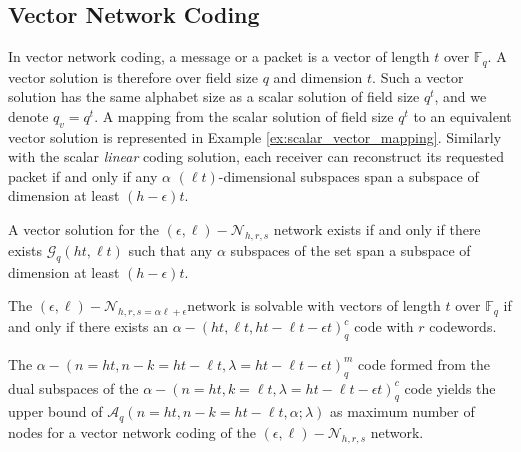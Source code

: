 \subsection{Vector Network Coding \label{subsec:Vector-network-coding}}

In vector network coding, a message or a packet is a vector of length
$t$ over $\ensuremath{\mathbb{F}}_{q}$. A vector solution is therefore
over field size $q$ and dimension $t$. Such a vector solution has
the same alphabet size as a scalar solution of field size $q^{t}$,
and we denote $q_{v}=q^{t}$. A mapping from the scalar solution of
field size $q^{t}$ to an equivalent vector solution is represented
in Example \ref{ex:scalar_vector_mapping}. Similarly with the scalar
\textit{linear} coding solution, each receiver can reconstruct its
requested packet if and only if any $\alpha$ $\left(\ell t\right)$-dimensional
subspaces span a subspace of dimension at least $\left(h-\epsilon\right)t$.
\begin{thm}
 A vector solution for the $(\epsilon,\ell)-\mathcal{N}_{h,r,s}$
network exists if and only if there exists $\mathcal{G}_{q}\left(ht,\ell t\right)$
such that any $\alpha$ subspaces of the set span a subspace of dimension
at least $\left(h-\epsilon\right)t$. 
\end{thm}
%
\begin{thm}
 The $(\epsilon,\ell)-\mathcal{N}_{h,r,s=\alpha\ell+\epsilon}$network
is solvable with vectors of length $t$ over $\ensuremath{\mathbb{F}}_{q}$
if and only if there exists an $\alpha-\left(ht,\ell t,ht-\ell t-\epsilon t\right)_{q}^{c}$
code with $r$ codewords. 
\end{thm}
\begin{cor}
The $\alpha-\left(n=ht,n-k=ht-\ell t,\lambda=ht-\ell t-\epsilon t\right)_{q}^{m}$
code formed from the dual subspaces of the $\alpha-\left(n=ht,k=\ell t,\lambda=ht-\ell t-\epsilon t\right)_{q}^{c}$
code yields the upper bound of $\mathcal{A}_{q}\left(n=ht,n-k=ht-\ell t,\alpha;\lambda\right)$
as maximum number of nodes for a vector network coding of the $(\epsilon,\ell)-\mathcal{N}_{h,r,s}$
network. \label{cor:dual_subspaces}
\end{cor}
